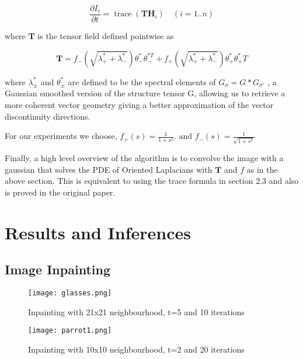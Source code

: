 \documentclass[a4paper]{article}
\begin{document}
$$\frac { \partial I _ { i } } { \partial t } = \operatorname { trace } \left( \mathbf { T } \mathbf { H } _ { i } \right) \quad ( i = 1 . . n )$$

where $\textbf{T}$ is the tensor field defined pointwise as 
    
$$\mathbf { T } = f _ { - } \left( \sqrt { \lambda _ { + } ^ { * } + \lambda _ { - } ^ { * } } \right) \theta _ { - } ^ { * } \theta _ { - } ^ { * T } + f _ { + } \left( \sqrt { \lambda _ { + } ^ { * } + \lambda _ { - } ^ { * } } \right) \theta _ { + } ^ { * } \theta _ { + } ^ { * } T$$

where $\lambda_{\pm}^*$ and $\theta_{\pm}^*$ are defined to be the spectral elements of $G_\sigma = G * G_{\sigma'}$ , a Gaussian smoothed version of the structure tensor G, allowing us to retrieve a more coherent vector geometry giving a better approximation of the vector discontinuity directions.  

For our experiments we choose, $f _ { + } ( s ) = \frac { 1 } { 1 + s ^ { 2 } } .\text { and } f _ { - } ( s ) = \frac { 1 } { \sqrt { 1 + s ^ { 2 } } }$ \newline

Finally, a high level overview of the algorithm is to convolve the image with a gaussian that solves the PDE of Oriented Laplacians with $\textbf{T}$ and $f$ as in the above section. This is equivalent to using the trace formula in section 2.3 and also is proved in the original paper.
    
\pagebreak
\section{Results and Inferences}

\subsection{Image Inpainting}

\begin{figure}[h]
\centering
\texttt{[image: glasses.png]}
\caption{\label{fig:data} Inpainting with 21x21 neighbourhood, t=5 and 10 iterations}
\end{figure}

\begin{figure}[h]
\centering
\texttt{[image: parrot1.png]}
\caption{\label{fig:data} Inpainting with 10x10 neighbourhood, t=2 and 20 iterations}
\end{figure}
\end{document}
